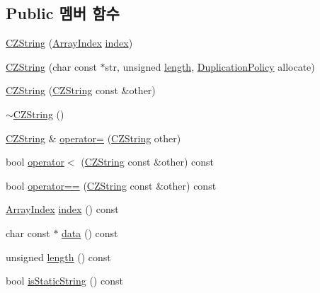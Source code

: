 \subsection*{Public 멤버 함수}
\begin{DoxyCompactItemize}
\item 
\hyperlink{class_json_1_1_value_1_1_c_z_string_a4b8aa6eaabdec78cffec96e088da996f}{C\+Z\+String} (\hyperlink{class_json_1_1_value_a184a91566cccca7b819240f0d5561c7d}{Array\+Index} \hyperlink{class_json_1_1_value_1_1_c_z_string_a0f3ba09401525d4f01dafd577122ee32}{index})
\item 
\hyperlink{class_json_1_1_value_1_1_c_z_string_a86a86eaf0cf26d4c861d0daa359d608a}{C\+Z\+String} (char const $\ast$str, unsigned \hyperlink{class_json_1_1_value_1_1_c_z_string_aa7ee665d162c1f33b3ec818e289d8a5e}{length}, \hyperlink{class_json_1_1_value_1_1_c_z_string_a2805c46fb4a72bbaed55de6d75941b6d}{Duplication\+Policy} allocate)
\item 
\hyperlink{class_json_1_1_value_1_1_c_z_string_a9685070d440335b55ef5c85747d25157}{C\+Z\+String} (\hyperlink{class_json_1_1_value_1_1_c_z_string}{C\+Z\+String} const \&other)
\item 
\hyperlink{class_json_1_1_value_1_1_c_z_string_add6989dc7073646b95e5ebacb3f07d51}{$\sim$\+C\+Z\+String} ()
\item 
\hyperlink{class_json_1_1_value_1_1_c_z_string}{C\+Z\+String} \& \hyperlink{class_json_1_1_value_1_1_c_z_string_a6513ff431b0593d5744868dfee739f7b}{operator=} (\hyperlink{class_json_1_1_value_1_1_c_z_string}{C\+Z\+String} other)
\item 
bool \hyperlink{class_json_1_1_value_1_1_c_z_string_ae023bb91b4b4520c82d5e6e4da8c310a}{operator$<$} (\hyperlink{class_json_1_1_value_1_1_c_z_string}{C\+Z\+String} const \&other) const
\item 
bool \hyperlink{class_json_1_1_value_1_1_c_z_string_ad41766c98fc6a6d5fcd72aaf78fc5db0}{operator==} (\hyperlink{class_json_1_1_value_1_1_c_z_string}{C\+Z\+String} const \&other) const
\item 
\hyperlink{class_json_1_1_value_a184a91566cccca7b819240f0d5561c7d}{Array\+Index} \hyperlink{class_json_1_1_value_1_1_c_z_string_a0f3ba09401525d4f01dafd577122ee32}{index} () const
\item 
char const  $\ast$ \hyperlink{class_json_1_1_value_1_1_c_z_string_af6eee54f8dc43a1203d5af6ba0a5c9a2}{data} () const
\item 
unsigned \hyperlink{class_json_1_1_value_1_1_c_z_string_aa7ee665d162c1f33b3ec818e289d8a5e}{length} () const
\item 
bool \hyperlink{class_json_1_1_value_1_1_c_z_string_a5991dfa2f6c2ba318373c7429fcd7a57}{is\+Static\+String} () const
\end{DoxyCompactItemize}
